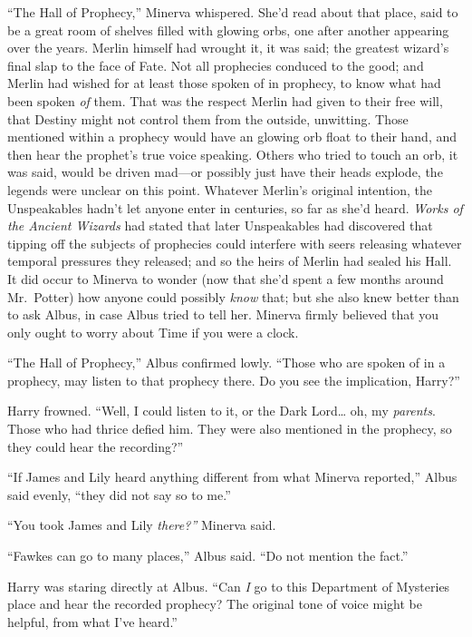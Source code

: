 ``The Hall of Prophecy,'' Minerva whispered. She'd read about that
place, said to be a great room of shelves filled with glowing orbs, one
after another appearing over the years. Merlin himself had wrought it,
it was said; the greatest wizard's final slap to the face of Fate. Not
all prophecies conduced to the good; and Merlin had wished for at least
those spoken of in prophecy, to know what had been spoken \emph{of}
them. That was the respect Merlin had given to their free will, that
Destiny might not control them from the outside, unwitting. Those
mentioned within a prophecy would have an glowing orb float to their
hand, and then hear the prophet's true voice speaking. Others who tried
to touch an orb, it was said, would be driven mad---or possibly just
have their heads explode, the legends were unclear on this point.
Whatever Merlin's original intention, the Unspeakables hadn't let anyone
enter in centuries, so far as she'd heard. \emph{Works of the Ancient
Wizards} had stated that later Unspeakables had discovered that tipping
off the subjects of prophecies could interfere with seers releasing
whatever temporal pressures they released; and so the heirs of Merlin
had sealed his Hall. It did occur to Minerva to wonder (now that she'd
spent a few months around Mr.~Potter) how anyone could possibly
\emph{know} that; but she also knew better than to ask Albus, in case
Albus tried to tell her. Minerva firmly believed that you only ought to
worry about Time if you were a clock.

``The Hall of Prophecy,'' Albus confirmed lowly. ``Those who are spoken
of in a prophecy, may listen to that prophecy there. Do you see the
implication, Harry?''

Harry frowned. ``Well, I could listen to it, or the Dark Lord\ldots{}
oh, my \emph{parents}. Those who had thrice defied him. They were also
mentioned in the prophecy, so they could hear the recording?''

``If James and Lily heard anything different from what Minerva
reported,'' Albus said evenly, ``they did not say so to me.''

``You took James and Lily \emph{there?''} Minerva said.

``Fawkes can go to many places,'' Albus said. ``Do not mention the
fact.''

Harry was staring directly at Albus. ``Can \emph{I} go to this
Department of Mysteries place and hear the recorded prophecy? The
original tone of voice might be helpful, from what I've heard.''

